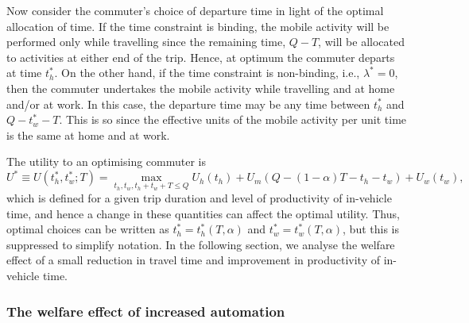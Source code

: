 \documentclass[12pt,a4paper,british]{article}
\begin{document}
Now consider the commuter's choice of departure time in light of the optimal allocation of time. If the time constraint is binding, the mobile activity will be performed only while travelling since the remaining time, $Q-T$, will be allocated to activities at either end of the trip. Hence, at optimum the commuter departs at time $t_{h}^{\ast}$. On the other hand, if the time constraint is non-binding, i.e., $\lambda^{\ast}=0$, then the commuter undertakes the mobile activity while travelling and at home and/or at work. In this case, the departure time may be any time between $t_{h}^{\ast}$ and $Q-t_{w}^{\ast}-T$. This is so since the effective units of the mobile activity per unit time is the same at home and at work.

The utility to an optimising commuter is%
\begin{equation}
U^{\ast}\equiv U\left(t_{h}^{\ast},t_{w}^{\ast};T\right)=\max_{t_{h},t_{w},t_{h}+t_{w}+T\leq Q}U_{h}\left(t_{h}\right)+U_{m}\left(Q-\left(1-\alpha\right)T-t_{h}-t_{w}\right)+U_{w}\left(t_{w}\right),\label{eq:UStarDet}
\end{equation}
which is defined for a given trip duration and level of productivity of in-vehicle time, and hence a change in these quantities can affect the optimal utility. Thus, optimal choices can be written as $t_h^{\ast}= t_h^{\ast} \left(T, \alpha \right)$ and $t_w^{\ast} = t_w^{\ast} \left(T, \alpha \right)$, but this is suppressed to simplify notation. In the following section, we analyse the welfare effect of a small reduction in travel time and improvement in productivity of in-vehicle time. %


\subsubsection*{The welfare effect of increased automation}
\end{document}

